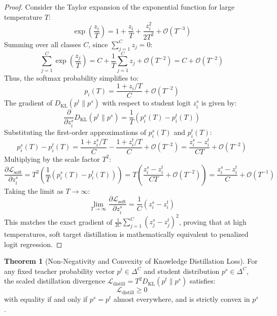 \documentclass[11pt,a4paper]{article}
\theoremstyle{definition}
\newtheorem{theorem}{\textbf{Theorem}}[section]
\begin{document}
\begin{proof}
Consider the Taylor expansion of the exponential function for large temperature $T$:
{\boldmath
\begin{equation}
\exp\left(\frac{z_i}{T}\right) = 1 + \frac{z_i}{T} + \frac{z_i^2}{2 T^2} + \mathcal{O}(T^{-3})
\end{equation}
}
Summing over all classes $C$, since $\sum_{j=1}^C z_j = 0$:
{\boldmath
\begin{equation}
\sum_{j=1}^C \exp\left(\frac{z_j}{T}\right) = C + \frac{1}{T} \sum_{j=1}^C z_j + \mathcal{O}(T^{-2}) = C + \mathcal{O}(T^{-2})
\end{equation}
}
Thus, the softmax probability simplifies to:
{\boldmath
\begin{equation}
p_i(T) = \frac{1 + z_i / T}{C} + \mathcal{O}(T^{-2})
\end{equation}
}
The gradient of $D_{\text{KL}}(p^t \| p^s)$ with respect to student logit $z_i^s$ is given by:
{\boldmath
\begin{equation}
\frac{\partial}{\partial z_i^s} D_{\text{KL}}(p^t \| p^s) = \frac{1}{T} (p_i^s(T) - p_i^t(T))
\end{equation}
}
Substituting the first-order approximations of $p_i^s(T)$ and $p_i^t(T)$:
{\boldmath
\begin{equation}
p_i^s(T) - p_i^t(T) = \frac{1 + z_i^s / T}{C} - \frac{1 + z_i^t / T}{C} + \mathcal{O}(T^{-2}) = \frac{z_i^s - z_i^t}{C T} + \mathcal{O}(T^{-2})
\end{equation}
}
Multiplying by the scale factor $T^2$:
{\boldmath
\begin{equation}
\frac{\partial \mathcal{L}_{\text{soft}}}{\partial z_i^s} = T^2 \left( \frac{1}{T} (p_i^s(T) - p_i^t(T)) \right) = T \left( \frac{z_i^s - z_i^t}{C T} + \mathcal{O}(T^{-2}) \right) = \frac{z_i^s - z_i^t}{C} + \mathcal{O}(T^{-1})
\end{equation}
}
Taking the limit as $T \to \infty$:
{\boldmath
\begin{equation}
\lim_{T \to \infty} \frac{\partial \mathcal{L}_{\text{soft}}}{\partial z_i^s} = \frac{1}{C} (z_i^s - z_i^t)
\end{equation}
}
This matches the exact gradient of $\frac{1}{2C} \sum_{j=1}^C (z_j^s - z_j^t)^2$, proving that at high temperatures, soft target distillation is mathematically equivalent to penalized logit regression.
\end{proof}

\begin{theorem}[Non-Negativity and Convexity of Knowledge Distillation Loss]
For any fixed teacher probability vector $p^t \in \Delta^C$ and student distribution $p^s \in \Delta^C$, the scaled distillation divergence $\mathcal{L}_{\text{distill}} = T^2 D_{\text{KL}}(p^t \| p^s)$ satisfies:
{\boldmath
\begin{equation}
\mathcal{L}_{\text{distill}} \ge 0
\end{equation}
}
with equality if and only if $p^s = p^t$ almost everywhere, and is strictly convex in $p^s$.
\end{theorem}
\end{document}
